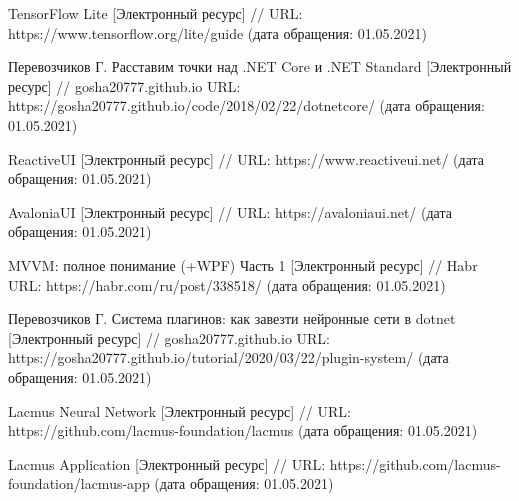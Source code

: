\begin{thebibliography}{00}
    TensorFlow Lite
    [Электронный ресурс] //
    URL: https://www.tensorflow.org/lite/guide
    (дата обращения: 01.05.2021)

    Перевозчиков Г. 
    Расставим точки над .NET Core и .NET Standard
    [Электронный ресурс] //
    gosha20777.github.io
    URL: https://gosha20777.github.io/code/2018/02/22/dotnetcore/
    (дата обращения: 01.05.2021)

    ReactiveUI
    [Электронный ресурс] //
    URL: https://www.reactiveui.net/
    (дата обращения: 01.05.2021)    

    AvaloniaUI
    [Электронный ресурс] //
    URL: https://avaloniaui.net/
    (дата обращения: 01.05.2021)

    MVVM: полное понимание (+WPF) Часть 1
    [Электронный ресурс] //
    Habr
    URL: https://habr.com/ru/post/338518/
    (дата обращения: 01.05.2021)
    
    Перевозчиков Г. 
    Система плагинов: как завезти нейронные сети в dotnet
    [Электронный ресурс] //
    gosha20777.github.io
    URL: https://gosha20777.github.io/tutorial/2020/03/22/plugin-system/
    (дата обращения: 01.05.2021)
    
    Lacmus Neural Network
    [Электронный ресурс] //
    URL: https://github.com/lacmus-foundation/lacmus
    (дата обращения: 01.05.2021)

    Lacmus Application
    [Электронный ресурс] //
    URL: https://github.com/lacmus-foundation/lacmus-app
    (дата обращения: 01.05.2021)

\end{thebibliography}
\endgroup

\clearpage
